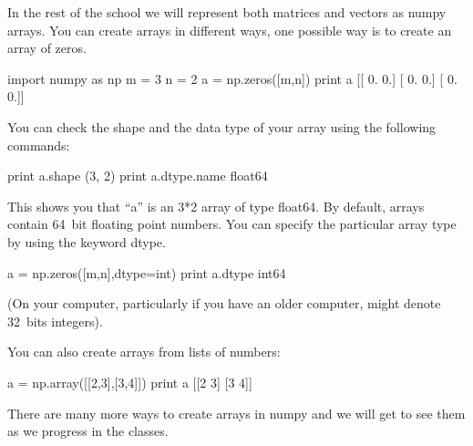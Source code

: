 \begin{exercise}
In the rest of the school we will represent both matrices and vectors as numpy arrays.
You can create arrays in different ways, one possible way is to create an array of zeros. 
\begin{python}
import numpy as np
m = 3
n = 2
a = np.zeros([m,n])
print a 
[[ 0.  0.]
 [ 0.  0.]
 [ 0.  0.]]
\end{python}

You can check the shape and the data type of your array using the following commands:
\begin{python}
print a.shape
(3, 2)
print a.dtype.name
float64
\end{python}
This shows you that ``a'' is an 3*2 array of type float64. By default, arrays
contain 64~bit floating point numbers. You can specify the particular array
type by using the keyword dtype.

\begin{python}
a = np.zeros([m,n],dtype=int)
print a.dtype
int64
\end{python}
(On your computer, particularly if you have an older computer,  might
denote 32~bits integers).

\smallskip

You can also create arrays from lists of numbers:
\begin{python}
a = np.array([[2,3],[3,4]])
print a
[[2 3]
 [3 4]]
\end{python}

There are many more ways to create arrays in numpy and we will get to see them as we progress in the classes.

\end{exercise}

